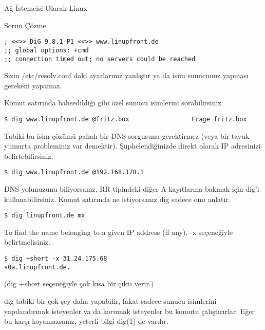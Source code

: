 \begin{section}{Ağ İstemcisi Olarak Linux}
\begin{subsection}{Sorun Çözme}
\begin{verbatim}
; <<>> DiG 9.8.1-P1 <<>> www.linupfront.de
;; global options: +cmd
;; connection timed out; no servers could be reached
\end{verbatim}
Sizin /etc/resolv.conf daki ayarlarınız yanlıştır ya da isim sunucunuz yapması gerekeni yapamaz.

Komut satırında bahsedildiği gibi özel sunucu isimlerini sorabilirsiniz.

\begin{verbatim}
$ dig www.linupfront.de @fritz.box                 Frage fritz.box
\end{verbatim}

Tabiki bu isim çözümü pahalı bir DNS sorgusunu gerektirmez (veya bir tavuk yumurta probleminiz var demektir). Şüphelendiğinizde direkt olarak IP adresinizi belirtebilirsiniz. 

\begin{verbatim}
$ dig www.linupfront.de @192.168.178.1
\end{verbatim}

DNS yolunuzunu biliyorsanız, RR tipindeki diğer A kayıtlarına bakmak için dig'i kullanabilirsiniz. Komut satırında ne istiyorsanız dig sadece onu anlatır.

\begin{verbatim}
$ dig linupfront.de mx
\end{verbatim}

To find the name belonging to a given IP address (if any), -x seçeneğiyle belirtmelisiniz.

\begin{verbatim}
$ dig +short -x 31.24.175.68
s0a.linupfront.de.
\end{verbatim}

(dig +short seçeneğiyle çok kısa bir çıktı verir.)

dig tabiki bir çok şey daha yapabilir, fakat sadece sunucu isimlerini yapılandırmak isteyenler ya da korumak isteyenler bu komutu çalıştırırlar. Eğer bu karşı koyamazsanız, yeterli bilgi dig(1) de vardır. 


\end{subsection}
\end{section}

